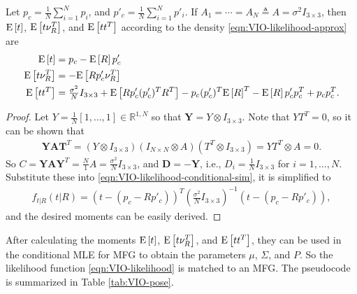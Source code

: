\begin{theorem} \label{thm:VIO-conditional-sim}
	Let $p_c = \tfrac{1}{N}\sum_{i=1}^N p_i$, and $p'_c = \tfrac{1}{N}\sum_{i=1}^N p'_i$.
	If $A_1 = \cdots = A_N \triangleq A = \sigma^2I_{3\times 3}$, then $\mathrm{E}\left[ t \right]$, $\mathrm{E}\left[ t\nu_R^T \right]$, and $\mathrm{E}\left[ tt^T \right]$ according to the density \eqref{eqn:VIO-likelihood-approx} are
	\begin{align}
		\mathrm{E}\left[ t \right] &= p_c - \mathrm{E}\left[ R \right]p'_c \\
		\mathrm{E}\left[ t\nu_R^T \right] &= -\mathrm{E}\left[ Rp'_c\nu_R^T \right] \\
		\mathrm{E}\left[ tt^T \right] &= \tfrac{\sigma^2}{N}I_{3\times 3} + \mathrm{E}\left[ Rp'_c(p'_c)^TR^T \right] - p_c(p'_c)^T\mathrm{E}\left[ R \right]^T - \mathrm{E}\left[ R \right]p'_cp_c^T + p_cp_c^T.
	\end{align}
\end{theorem}
\begin{proof}
	Let $Y = \tfrac{1}{N}[1,\ldots,1]\in\mathbb{R}^{1,N}$ so that $\mathbf{Y} = Y\otimes I_{3\times 3}$.
	Note that $YT^T = 0$, so it can be shown that
	\begin{align*}
		\mathbf{YAT}^T = (Y\otimes I_{3\times 3})(I_{N\times N}\otimes A) (T^T\otimes I_{3\times 3}) = YT^T\otimes A = 0.
	\end{align*}
	So $C = \mathbf{YAY}^T = \tfrac{N}{1}A = \tfrac{\sigma^2}{N} I_{3\times 3}$, and $\mathbf{D} = -\mathbf{Y}$, i.e., $D_i = \tfrac{1}{N}I_{3\times 3}$ for $i=1,\ldots,N$.
	Substitute these into \eqref{eqn:VIO-likelihood-conditional-sim}, it is simplified to
	\begin{align}
		f_{t|R}(t|R) = \left( t - (p_c-Rp'_c) \right)^T \left( \tfrac{\sigma^2}{N}I_{3\times 3} \right)^{-1} \left( t - (p_c-Rp'_c) \right),
	\end{align}
	and the desired moments can be easily derived.
\end{proof}

After calculating the moments $\mathrm{E}\left[ t \right]$, $\mathrm{E}\left[ t\nu_R^T \right]$, and $\mathrm{E}\left[ tt^T \right]$, they can be used in the conditional MLE for MFG to obtain the parameters $\mu$, $\Sigma$, and $P$.
So the likelihood function \eqref{eqn:VIO-likelihood} is matched to an MFG.
The pseudocode is summarized in Table \ref{tab:VIO-pose}.

